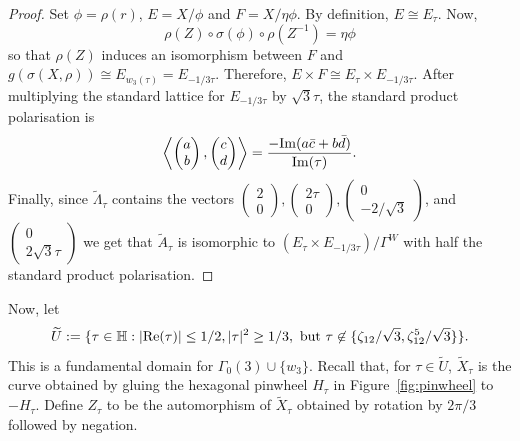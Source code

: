 \documentclass[a4paper,11pt]{amsart}
\numberwithin{equation}{section}
\numberwithin{figure}{section}
\numberwithin{table}{section}
\begin{document}
\begin{proof}
    Set $\phi = \rho(r)$, $E = X/\phi$ and $F = X/\eta\phi$. By definition, $E\cong E_{\tau}$. Now,
    \[\rho(Z)\circ\sigma(\phi)\circ\rho(Z^{-1}) = \eta\phi\]
    so that $\rho(Z)$ induces an isomorphism between $F$ and $g(\sigma(X,\rho))\cong E_{w_{3}(\tau)} = E_{{-1}/{3\tau}}$. Therefore, $E\times F\cong E_{\tau}\times E_{{-1}/{3\tau}}$. After multiplying the standard lattice for $E_{{-1}/{3\tau}}$ by $\sqrt{3}\tau$, the standard product polarisation is
    \[\left\langle\begin{pmatrix}
            a \\
            b
        \end{pmatrix},\begin{pmatrix}
            c \\
            d
        \end{pmatrix}\right\rangle = \frac{-{\rm{Im}}(a\bar{c}+b\bar{d})}{{\rm{Im}}(\tau)}.\]
    Finally, since $\widetilde{\Lambda}_{\tau}$ contains the vectors $\begin{pmatrix}
            2 \\
            0
        \end{pmatrix},\begin{pmatrix}
            2\tau \\
            0
        \end{pmatrix},\begin{pmatrix}
            0 \\
            -2/\sqrt{3}
        \end{pmatrix}$, and $\begin{pmatrix}
        0 \\
        2\sqrt{3}\tau
        \end{pmatrix}$
    we get that $\widetilde{A}_{\tau}$ is isomorphic to $(E_{\tau}\times E_{{-1}/{3\tau}})/\Gamma^{W}$ with half the standard product polarisation.
\end{proof}

Now, let
\[\widetilde{U} := \{\tau\in\mathbb{H}: |{\rm{Re}}(\tau)|\leq 1/2, |\tau|^2\geq1/3,\text{ but } \tau\not\in\{\zeta_{12}/\sqrt{3},\zeta_{12}^5/\sqrt{3}\}\}.\]
This is a fundamental domain for $\Gamma_{0}(3)\cup\{w_{3}\}$. Recall that, for $\tau\in\widetilde{U}$, $\widetilde{X}_{\tau}$ is the curve obtained by gluing the hexagonal pinwheel $H_{\tau}$ in Figure~\ref{fig:pinwheel} to $-H_{\tau}$. Define $Z_{\tau}$ to be the automorphism of $\widetilde{X}_{\tau}$ obtained by rotation by $2\pi/3$ followed by negation.
\end{document}
